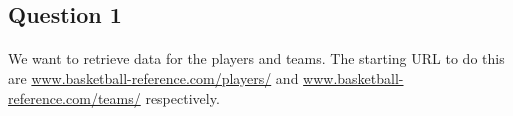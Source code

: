 
\subsection{Question 1}
\label{subsec:311}

\paragraph{} We want to retrieve data for the players and teams. The starting URL to do this are \url{www.basketball-reference.com/players/} and \url{www.basketball-reference.com/teams/} respectively.